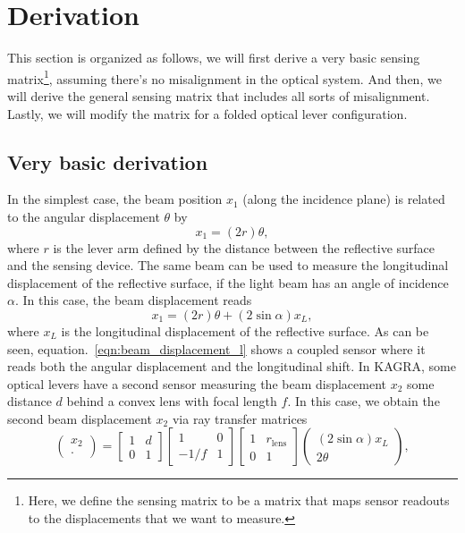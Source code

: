 \section{Derivation}
This section is organized as follows, we will first derive a very basic sensing matrix\footnote{Here, we define the sensing matrix to be a matrix that maps sensor readouts to the displacements that we want to measure.}, assuming there's no misalignment in the optical system.
And then, we will derive the general sensing matrix that includes all sorts of misalignment.
Lastly, we will modify the matrix for a folded optical lever configuration.
\subsection{Very basic derivation \label{sec:very_basic_derivation}}
In the simplest case, the beam position $x_1$ (along the incidence plane) is related to the angular displacement $\theta$ by
\begin{equation}
	x_1=\left(2r\right)\theta,
\end{equation}
where $r$ is the lever arm defined by the distance between the reflective surface and the sensing device.
The same beam can be used to measure the longitudinal displacement of the reflective surface, if the light beam has an angle of incidence $\alpha$.
In this case, the beam displacement reads
\begin{equation}
	x_1=\left(2r\right)\theta + \left(2\sin{\alpha}\right)x_L,
	\label{eqn:beam_displacement_l}
\end{equation}
where $x_L$ is the longitudinal displacement of the reflective surface.
As can be seen, equation.~\eqref{eqn:beam_displacement_l} shows a coupled sensor where it reads both the angular displacement and the longitudinal shift.
In KAGRA, some optical levers have a second sensor measuring the beam displacement $x_2$ some distance $d$ behind a convex lens with focal length $f$.
In this case, we obtain the second beam displacement $x_2$ via ray transfer matrices \cite{enwiki:1018856234}
\begin{equation}
	\begin{pmatrix}
		x_2\\
		\cdot
	\end{pmatrix}
	=
	\begin{bmatrix}
		1 & d\\
		0 & 1
	\end{bmatrix}
	\begin{bmatrix}
		1 & 0\\
		-1/f & 1
	\end{bmatrix}
	\begin{bmatrix}
		1 & r_\mathrm{lens} \\
		0 & 1
	\end{bmatrix}
	\begin{pmatrix}
		\left(2\sin{\alpha} \right)x_L\\
		2\theta
	\end{pmatrix},
\end{equation}

